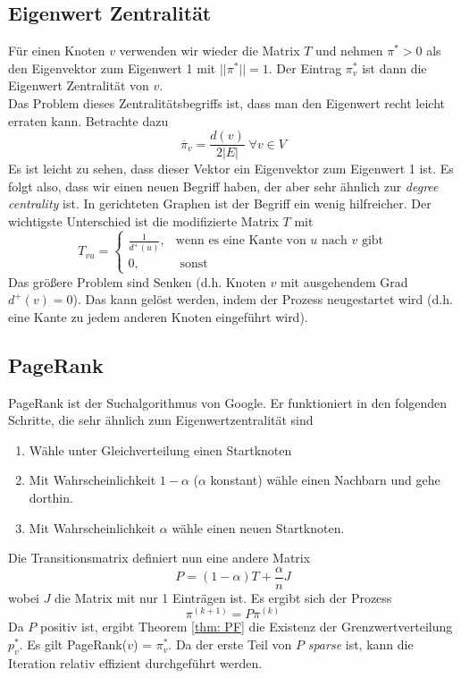 \documentclass[a4paper, 12pt]{article}
\theoremstyle{plain}
\theoremstyle{definition}
\theoremstyle{lemma}
\theoremstyle{remark}
\theoremstyle{corollary}
\theoremstyle{example}
\begin{document}
	\subsection{Eigenwert Zentralität}
	Für einen Knoten $v$ verwenden wir wieder die Matrix $T$ und nehmen $\pi^* > 0$ als den Eigenvektor zum Eigenwert 1 mit $||\pi^*|| = 1$. Der Eintrag $\pi^*_v$ ist dann die Eigenwert Zentralität von $v$.\\
	Das Problem dieses Zentralitätsbegriffs ist, dass man den Eigenwert recht leicht erraten kann. Betrachte dazu \[\overline{\pi}_v = \frac{d(v)}{2\left|E\right|} \; \forall v \in V\]
	Es ist leicht zu sehen, dass dieser Vektor ein Eigenvektor zum Eigenwert 1 ist. Es folgt also, dass wir einen neuen Begriff haben, der aber sehr ähnlich zur \textit{degree centrality} ist. In gerichteten Graphen ist der Begriff ein wenig hilfreicher. Der wichtigste Unterschied ist die modifizierte Matrix $T$ mit \[T_{vu} = \begin{cases}
		\frac{1}{d^+(u)}, & \text{wenn es eine Kante von $u$ nach $v$ gibt}\\
		0, & \text{ sonst}
	\end{cases}\]
	Das größere Problem sind Senken (d.h. Knoten $v$ mit ausgehendem Grad $d^+(v) = 0$). Das kann gelöst werden, indem der Prozess neugestartet wird (d.h. eine Kante zu jedem anderen Knoten eingeführt wird).
	\subsection{PageRank}
	PageRank ist der Suchalgorithmus von Google. Er funktioniert in den folgenden Schritte, die sehr ähnlich zum Eigenwertzentralität sind \begin{enumerate}
		\item Wähle unter Gleichverteilung einen Startknoten
		\item Mit Wahrscheinlichkeit $1-\alpha$ ($\alpha$ konstant) wähle einen Nachbarn und gehe dorthin.
		\item Mit Wahrscheinlichkeit $\alpha$ wähle einen neuen Startknoten.
	\end{enumerate}
	Die Transitionsmatrix definiert nun eine andere Matrix \[P = (1-\alpha)T + \frac{\alpha}{n} J\] wobei $J$ die Matrix mit nur 1 Einträgen ist. Es ergibt sich der Prozess \[\pi^{(k+1)} = P\pi^{(k)}\] Da $P$ positiv ist, ergibt Theorem \ref{thm: PF} die Existenz der Grenzwertverteilung $p_v^*$. Es gilt PageRank($v$) = $\pi^*_v$. Da der erste Teil von $P$ \textit{sparse} ist, kann die Iteration relativ effizient durchgeführt werden.
\end{document}
